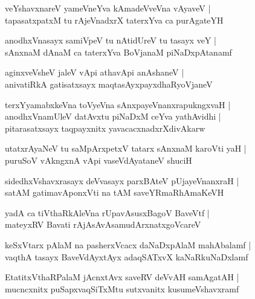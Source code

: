 \documentclass[twoside,12pt,openright]{book}
\newcounter{shloka}[chapter]
\begin{document}
\begin{shloka}
veYshavxnareV yameVneYva kAmadeVveVna vAyaveV |\\
tapasatxpatxM tu rAjeVnadxrX taterxYva ca purAgateYH 
\end{shloka}

\begin{shloka}
anodhxVnasayx samiVpeV tu nAtidUreV tu tasayx veY |\\
sAnxnaM dAnaM ca taterxYva BoVjanaM piNaDxpAtanamf
\end{shloka}

\begin{shloka}
aginxveVsheV jaleV vApi athavApi anAshaneV |\\
anivatiRkA gatisatxsayx maqtasAyxpayxdhaRyoVjaneV 
\end{shloka}

\begin{shloka}
terxYyamabxkeVna toVyeVna sAnxpayeVnanxrapukngxvaH |\\
anodhxVnamUleV datAvxtu piNaDxM ceYva yathAvidhi |\\
pitarasatxsayx taqpayxnitx yavacacxnadxrXdivAkarw
\end{shloka}

\begin{shloka}
utatxrAyaNeV tu saMpArxpetxV tatarx sAnxnaM karoVti yaH |\\
puruSoV vAkngxnA vApi vaseVdAyataneV shuciH 
\end{shloka}

\begin{shloka}
sidedhxVshavxrasayx deVvasayx parxBAteV pUjayeVnanxraH |\\
satAM gatimavAponxVti na tAM saveYRmaRhAmaKeVH 
\end{shloka}

\begin{shloka}
yadA ca tiVthaRkAleVna rUpavAsusxBagoV BaveVtf |\\
mateyxRV Bavati rAjAsAvAsamudArxnatxgoVcareV 
\end{shloka}

\begin{shloka}
keSxVtarx pAlaM na pasherxVcacx daNaDxpAlaM mahAbalamf |\\
vaqthA tasayx BaveVdAyxtAyx adaqSATxvX kaNaRkuNaDxlamf 
\end{shloka}

\begin{shloka}
EtatitxVthaRPalaM jAcnxtAvx saveRV deVvAH samAgatAH |\\
mucncxnitx puSapxvaqSiTxMtu sutxvanitx kusumeVshavxramf 
\end{shloka}
\end{document}
